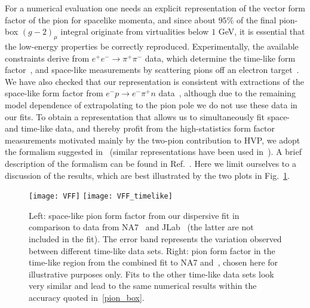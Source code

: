 \documentclass[epj]{webofc}
\newcommand{\<}{\langle}
\renewcommand{\>}{\rangle}
\begin{document}
For a numerical evaluation one needs an explicit representation of the
vector form factor of the pion for spacelike momenta, and since about
$95\%$ of the final pion-box $(g-2)_\mu$ integral originate 
from virtualities below $1$ GeV, it is essential that the low-energy
properties be correctly reproduced. Experimentally, the available
constraints derive from $e^+e^-\to\pi^+\pi^-$ data, which determine the
time-like form
factor~\cite{Achasov:2006vp,Akhmetshin:2006bx,Aubert:2009ad,Ambrosino:2010bv,Babusci:2012rp,Ablikim:2015orh},
and space-like measurements by scattering pions off an electron
target~\cite{Dally:1982zk,Amendolia:1986wj}. We have also checked that our
representation is consistent with extractions of the space-like form factor
from $e^-p\to e^- \pi^+ n$
data~\cite{Horn:2006tm,Tadevosyan:2007yd,Blok:2008jy,Huber:2008id},
although due to the remaining model dependence of extrapolating to the pion
pole we do not use these data in our fits. To obtain a representation that
allows us to simultaneously fit space- and time-like data, and thereby
profit from the high-statistics form factor measurements motivated mainly
by the two-pion contribution to HVP, we adopt the formalism suggested
in~\cite{Leutwyler:2002hm,Colangelo:2003yw} (similar representations have
been used
in~\cite{DeTroconiz:2001rip,deTroconiz:2004yzs,Ananthanarayan:2013zua,Ananthanarayan:2016mns,Hoferichter:2016duk,Hanhart:2016pcd}). A
brief description of the formalism can be found in
Ref.~\cite{Colangelo:2017fiz}. Here we limit ourselves to a discussion of
the results, which are best illustrated by the two plots in
Fig.~\ref{fig:VFF}. 

\begin{figure}[t]
\centering
\texttt{[image: VFF]}
\texttt{[image: VFF\_timelike]}
\caption{Left: space-like pion form factor from our dispersive fit in
  comparison to data from NA7~\cite{Amendolia:1986wj} and
  JLab~\cite{Tadevosyan:2007yd,Blok:2008jy,Huber:2008id} (the latter are
  not included in the fit). The error band represents the variation
  observed between different time-like data sets. Right: pion form factor
  in the time-like region from the combined fit to NA7
  and~\cite{Ambrosino:2010bv}, 
chosen here for illustrative purposes only. Fits to the other time-like
data sets look very similar and lead to the same numerical results within
the accuracy quoted in~\eqref{pion_box}.} 
\label{fig:VFF}
\end{figure}
\end{document}
